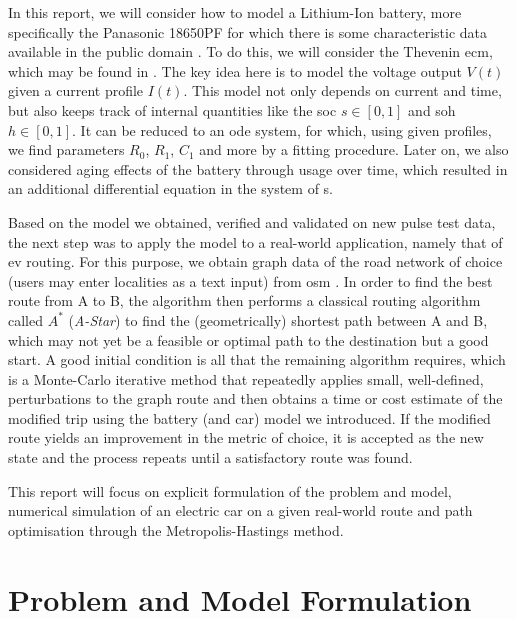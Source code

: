 \documentclass{prettytex/ox/mmsc-special-topic}
\begin{document}
  In this report, we will consider how to model a Lithium-Ion battery, more specifically the Panasonic 18650PF for which there is some characteristic data available in the public domain \parencite{panasonicnums}.
  To do this, we will consider the Thevenin \gls{ecm}, which may be found in .
  The key idea here is to model the voltage output $V(t)$ given a current profile $I(t)$.
  This model not only depends on current and time, but also keeps track of internal quantities like the \gls{soc} $s \in [0, 1]$ and \gls{soh} $h \in [0, 1]$.
  It can be reduced to an \gls{ode} system, for which, using given profiles, we find parameters $R_0$, $R_1$, $C_1$ and more by a fitting procedure.
  Later on, we also considered aging effects of the battery through usage over time, which resulted in an additional differential equation in the system of s.

  Based on the model we obtained, verified and validated on new pulse test data, the next step was to apply the model to a real-world application, namely that of \gls{ev} routing.
  For this purpose, we obtain graph data of the road network of choice (users may enter localities as a text input) from \gls{osm} \parencite{osm}.
  In order to find the best route from A to B, the algorithm then performs a classical routing algorithm called $A^*$ (\emph{A-Star}) to find the (geometrically) shortest path between A and B, which may not yet be a feasible or optimal path to the destination but a good start.
  A good initial condition is all that the remaining algorithm requires, which is a Monte-Carlo iterative method that repeatedly applies small, well-defined, perturbations to the graph route and then obtains a time or cost estimate of the modified trip using the battery (and car) model we introduced.
  If the modified route yields an improvement in the metric of choice, it is accepted as the new state and the process repeats until a satisfactory route was found.

  This report will focus on explicit formulation of the problem and model, numerical simulation of an electric car on a given real-world route and path optimisation through the Metropolis-Hastings method.

  \section{Problem and Model Formulation}
\end{document}
